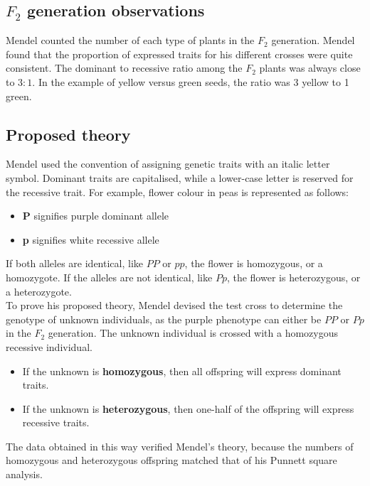 \documentclass[11pt]{article}
\begin{document}
\newpage

\subsection{\(F_2\) generation observations}
\label{sec:org886def3}
Mendel counted the number of each type of plants in the \(F_2\) generation. Mendel found that the proportion of expressed traits for his different crosses were quite consistent. The dominant to recessive ratio among the \(F_2\) plants was always close to \(3:1\). In the example of yellow versus green seeds, the ratio was 3 yellow to 1 green.

\subsection{Proposed theory}
\label{sec:org598be89}
Mendel used the convention of assigning genetic traits with an italic letter symbol. Dominant traits are capitalised, while a lower-case letter is reserved for the recessive trait. For example, flower colour in peas is represented as follows:
\begin{itemize}
\item \textbf{P} signifies purple dominant allele
\item \textbf{p} signifies white recessive allele
\end{itemize}

If both alleles are identical, like \(PP\) or \(pp\), the flower is homozygous, or a homozygote. If the alleles are not identical, like \(Pp\), the flower is heterozygous, or a heterozygote.
\\[0pt]

To prove his proposed theory, Mendel devised the test cross to determine the genotype of unknown individuals, as the purple phenotype can either be \(PP\) or \(Pp\) in the \(F_2\) generation. The unknown individual is crossed with a homozygous recessive individual.
\begin{itemize}
\item If the unknown is \textbf{homozygous}, then all offspring will express dominant traits.
\item If the unknown is \textbf{heterozygous}, then one-half of the offspring will express recessive traits.
\end{itemize}

The data obtained in this way verified Mendel's theory, because the numbers of homozygous and heterozygous offspring matched that of his Punnett square analysis.
\end{document}
